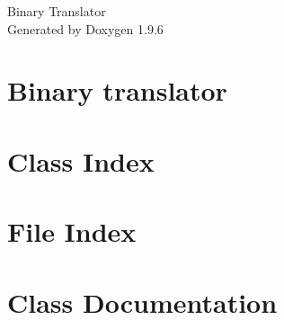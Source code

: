 \documentclass[twoside]{book}
\newcommand{\+}{\discretionary{\mbox{\scriptsize$\hookleftarrow$}}{}{}}
\newcommand{\clearemptydoublepage}{%
    \newpage{\pagestyle{empty}\cleardoublepage}%
  }
\begin{document}
  \raggedbottom
    \hypersetup{pageanchor=false,
                bookmarksnumbered=true,
                pdfencoding=unicode
               }
  \begin{titlepage}
  \vspace*{7cm}
  \begin{center}%
  {\Large Binary Translator}\\
  \vspace*{1cm}
  {\large Generated by Doxygen 1.9.6}\\
  \end{center}
  \end{titlepage}
  \clearemptydoublepage
  \tableofcontents
  \clearemptydoublepage
  \hypersetup{pageanchor=true}
\chapter{Binary translator}
\label{index}\hypertarget{index}{}
\chapter{Class Index}

\chapter{File Index}

\chapter{Class Documentation}














\end{document}
